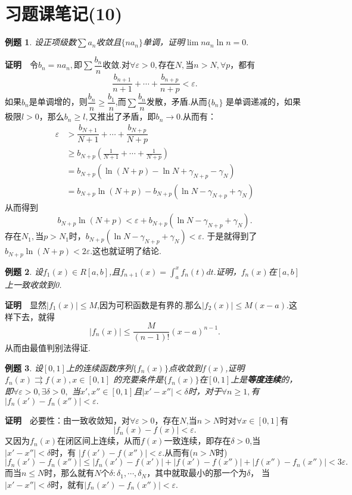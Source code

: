 \documentclass[UTF8]{article}
\newcommand{\zm}{\textbf{证明}$\quad$}
\newtheorem{exa}{\hspace{2em}例题}[section]
\begin{document}
\clearpage
\section{习题课笔记(10)}
\begin{exa}
  设正项级数$\sum a_n$收敛且$\{na_n\}$单调，证明$\lim n a_n\ln n=0.$
\end{exa}
\zm 令$b_n=na_n,$即$\sum\dfrac{b_n}{n}$收敛.对$\forall\varepsilon>0,$存在$N,$当$n>N,\forall p$，都有
$$\dfrac{b_{n+1}}{n+1}+\cdots+\dfrac{b_{n+p}}{n+p}<\varepsilon.$$
如果$b_n$是单调增的，则$\dfrac{b_n}{n}\ge\dfrac{b_1}{n}$,而$\sum\dfrac{b_n}{n}$发散，矛盾.从而$\{b_n\}$
是单调递减的，如果极限$l>0$，那么$b_n\ge l,$又推出了矛盾，即$b_n\to0.$从而有：
\begin{align*}
  \varepsilon&>\dfrac{b_{N+1}}{N+1}+\cdots+\dfrac{b_{N+p}}{N+p}\\
  &\ge b_{N+p}(\frac{1}{N+1}+\cdots+\frac{1}{N+p})\\
  &=b_{N+p}(\ln(N+p)-\ln N+\gamma_{N+p}-\gamma_N)\\
  &=b_{N+p}\ln(N+p)-b_{N+p}(\ln N-\gamma_{N+p}+\gamma_N)
\end{align*}
从而得到
$$b_{N+p}\ln(N+p)<\varepsilon+b_{N+p}(\ln N-\gamma_{N+p}+\gamma_N).$$
存在$N_1,$当$p>N_1$时，$b_{N+p}(\ln N-\gamma_{N+p}+\gamma_N)<\varepsilon.$
于是就得到了$b_{N+p}\ln(N+p)<2\varepsilon.$这也就证明了结论.
\begin{exa}
  设$f_1(x)\in R[a,b]$,且$f_{n+1}(x)=\int_a^x f_n(t) dt.$证明，$f_n(x)$在$[a,b]$上一致收敛到0.
\end{exa}
\zm 显然$|f_1(x)|\le M$,因为可积函数是有界的.那么$|f_2(x)|\le M(x-a).$这样下去，就得
$$|f_n(x)|\le\frac{M}{(n-1)!}(x-a)^{n-1}.$$
从而由最值判别法得证.
\begin{exa}
  设$[0,1]$上的连续函数序列$\{f_n(x)\}$点收敛到$f(x)$,证明$f_n(x)\rightrightarrows f(x),x\in[0,1]$
  的充要条件是$\{f_n(x)\}$在$[0,1]$上是\textbf{等度连续}的，即$\forall \varepsilon>0,\exists\delta>0,$
  当$x',x''\in[0,1]$且$|x'-x''|<\delta$时，对于$\forall n\ge 1,$有$|f_n(x')-f_n(x'')|<\varepsilon.$
\end{exa}
\zm 必要性：由一致收敛知，对$\forall \varepsilon>0$，存在$N$,当$n>N$时对$\forall x\in[0,1]$有
$$|f_n(x)-f(x)|<\varepsilon.$$
又因为$f_n(x)$在闭区间上连续，从而$f(x)$一致连续，即存在$\delta>0$,当$|x'-x''|<\delta$时，有
$|f(x')-f(x'')|<\varepsilon.$从而有($n>N$时)
$$|f_n(x')-f_n(x'')|\le|f_n(x')-f(x')|+|f(x')-f(x'')|+|f(x'')-f_n(x'')|<3\varepsilon.$$
而当$n\le N$时，那么就有$N$个$\delta:\delta_1,\cdots,\delta_N$，其中就取最小的那一个为$\delta$，
当$|x'-x''|<\delta$时，就有$|f_n(x')-f_n(x'')|<\varepsilon.$
\end{document}
